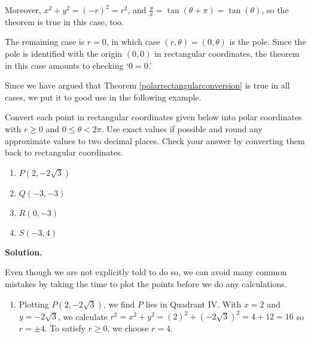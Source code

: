 \documentclass{ximera}
\begin{document}
\smallskip

Moreover, $x^2 + y^2 = (-r)^2 = r^2$, and $\frac{y}{x} = \tan(\theta + \pi) = \tan(\theta)$, so the theorem is true in this case, too.  

\smallskip

The remaining case is $r = 0$, in which case $(r,\theta) = (0,\theta)$ is the pole.  Since the pole is identified with the origin $(0,0)$ in rectangular coordinates, the theorem in this case amounts to checking `$0=0$.'  

\smallskip

Since we have argued that  Theorem \ref{polarrectangularconversion} is true in all cases, we put it to good use in the following example.

\smallskip


\begin{example}  \label{pointconversionex}   Convert each point in rectangular coordinates given below into polar coordinates with $r \geq 0$ and $0 \leq \theta < 2\pi$.  Use exact values if possible and round any approximate values to two decimal places.  Check your answer by converting them back to rectangular coordinates.

\begin{multicols}{4}

\begin{enumerate}

\item  $P\left(2,-2\sqrt{3}\right)$

\item  $Q(-3,-3)$

\item  $R(0,-3)$

\item  $S(-3,4)$

\end{enumerate}

\end{multicols}

{\bf Solution.}

Even though we are not explicitly told to do so, we can avoid many common mistakes by taking the time to plot the points before we do any calculations. 


\begin{enumerate}

\item  Plotting $P\left(2,-2\sqrt{3}\right)$, we find $P$ lies in Quadrant IV. With $x = 2$ and $y = -2\sqrt{3}$, we calculate $r^2 = x^2 + y^2 = (2)^2 + \left(-2\sqrt{3}\right)^2 = 4+12 = 16$ so $r = \pm 4$.  To satisfy $r \geq 0$, we choose $r = 4$.  


\end{enumerate}
\end{example}
\end{document}
